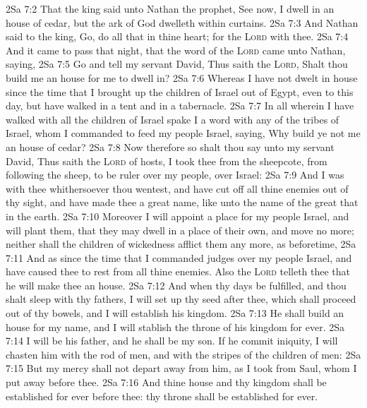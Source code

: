 \vs 2Sa 7:2 That the king said unto Nathan the prophet, See now, I dwell in an house of cedar, but the ark of God dwelleth within curtains.
\vs 2Sa 7:3 And Nathan said to the king, Go, do all that  in thine heart; for the \textsc{Lord}  with thee.
\vs 2Sa 7:4 And it came to pass that night, that the word of the \textsc{Lord} came unto Nathan, saying,
\vs 2Sa 7:5 Go and tell my servant David, Thus saith the \textsc{Lord}, Shalt thou build me an house for me to dwell in?
\vs 2Sa 7:6 Whereas I have not dwelt in  house since the time that I brought up the children of Israel out of Egypt, even to this day, but have walked in a tent and in a tabernacle.
\vs 2Sa 7:7 In all  wherein I have walked with all the children of Israel spake I a word with any of the tribes of Israel, whom I commanded to feed my people Israel, saying, Why build ye not me an house of cedar?
\vs 2Sa 7:8 Now therefore so shalt thou say unto my servant David, Thus saith the \textsc{Lord} of hosts, I took thee from the sheepcote, from following the sheep, to be ruler over my people, over Israel:
\vs 2Sa 7:9 And I was with thee whithersoever thou wentest, and have cut off all thine enemies out of thy sight, and have made thee a great name, like unto the name of the great  that  in the earth.
\vs 2Sa 7:10 Moreover I will appoint a place for my people Israel, and will plant them, that they may dwell in a place of their own, and move no more; neither shall the children of wickedness afflict them any more, as beforetime,
\vs 2Sa 7:11 And as since the time that I commanded judges  over my people Israel, and have caused thee to rest from all thine enemies. Also the \textsc{Lord} telleth thee that he will make thee an house.
\vs 2Sa 7:12 And when thy days be fulfilled, and thou shalt sleep with thy fathers, I will set up thy seed after thee, which shall proceed out of thy bowels, and I will establish his kingdom.
\vs 2Sa 7:13 He shall build an house for my name, and I will stablish the throne of his kingdom for ever.
\vs 2Sa 7:14 I will be his father, and he shall be my son. If he commit iniquity, I will chasten him with the rod of men, and with the stripes of the children of men:
\vs 2Sa 7:15 But my mercy shall not depart away from him, as I took  from Saul, whom I put away before thee.
\vs 2Sa 7:16 And thine house and thy kingdom shall be established for ever before thee: thy throne shall be established for ever.
